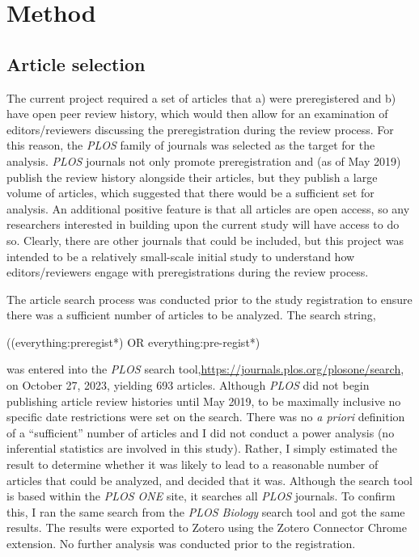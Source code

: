 \documentclass[authordate, meta]{jote-new-article}
\begin{document}
	\section{\textbf{Method}}



	\subsection{Article selection}



	The current project required a set of articles that a) were preregistered and b) have open peer review history, which would then allow for an examination of editors/reviewers discussing the preregistration during the review process. For this reason, the \emph{PLOS} family of journals was selected as the target for the analysis. \emph{PLOS} journals not only promote preregistration and (as of May 2019) publish the review history alongside their articles, but they publish a large volume of articles, which suggested that there would be a sufficient set for analysis. An additional positive feature is that all articles are open access, so any researchers interested in building upon the current study will have access to do so. Clearly, there are other journals that could be included, but this project was intended to be a relatively small-scale initial study to understand how editors/reviewers engage with preregistrations during the review process.



	The article search process was conducted prior to the study registration to ensure there was a sufficient number of articles to be analyzed. The search string,



	((everything:preregist*) OR everything:pre-regist*)



	was entered into the \emph{PLOS} search tool,\url{https://journals.plos.org/plosone/search}, on October 27, 2023, yielding 693 articles. Although \emph{PLOS} did not begin publishing article review histories until May 2019, to be maximally inclusive no specific date restrictions were set on the search. There was no \emph{a priori} definition of a “sufficient” number of articles and I did not conduct a power analysis (no inferential statistics are involved in this study). Rather, I simply estimated the result to determine whether it was likely to lead to a reasonable number of articles that could be analyzed, and decided that it was. Although the search tool is based within the \emph{PLOS ONE} site, it searches all \emph{PLOS} journals. To confirm this, I ran the same search from the \emph{PLOS Biology} search tool and got the same results. The results were exported to Zotero using the Zotero Connector Chrome extension. No further analysis was conducted prior to the registration.
\end{document}
